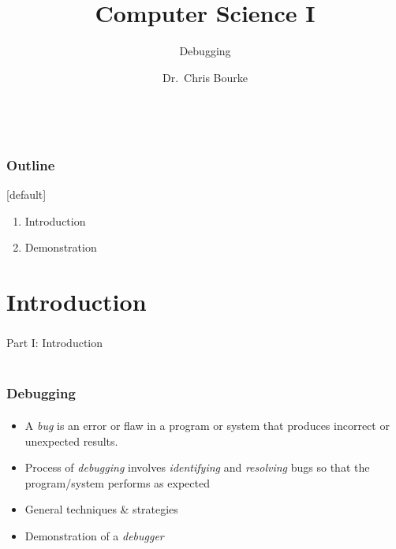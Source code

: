 \documentclass[]{beamer}
\title[~]{Computer Science I}
\subtitle{Debugging}
\author[~]{Dr.\ Chris Bourke\\ \email{cbourke@cse.unl.edu}} %
\date{~}
\begin{document}
\begin{frame}
  \titlepage
\end{frame}


\begin{frame}
  \frametitle{Outline}

[default]
\begin{enumerate}
  \item Introduction 
  \item Demonstration
\end{enumerate}

\end{frame}

\section{Introduction}

\begin{frame}
    \frametitle{}
    \framesubtitle{}
    
    \begin{center}
    {\Huge Part I: Introduction}\\
    {\Large ~}
    \end{center}

\end{frame}


\begin{frame}[fragile]
    \frametitle{Debugging}
    \framesubtitle{}

\begin{itemize}[<+->]
  \item A \emph{bug} is an error or flaw in a program or system that
  produces incorrect or unexpected results.
  \item Process of \emph{debugging} involves \emph{identifying} and
  \emph{resolving} bugs so that the program/system performs as expected
  \item General techniques \& strategies
  \item Demonstration of a \emph{debugger}
\end{itemize}

\end{frame}
\end{document}
